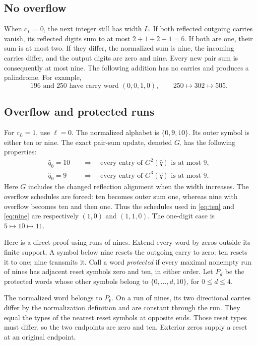 \documentclass[11pt]{article}
\begin{document}
\subsection{No overflow}
When $c_L=0$, the next integer still has width $L$. If both reflected outgoing
carries vanish, its reflected digits sum to at most $2+1+2+1=6$.
If both are one, their sum is at most two. If they differ, the normalized
sum is nine, the incoming carries differ, and the output digits are zero
and nine. Every new pair sum is consequently at most nine. The following
addition has no carries and produces a palindrome. For example,
\[
196\text{ and }250\text{ have carry word }(0,0,1,0),
\qquad 250\longmapsto302\longmapsto505.
\]

\subsection{Overflow and protected runs}
For $c_L=1$, use $\ell=0$. The normalized alphabet is $\{0,9,10\}$.
Its outer symbol is either ten or nine. The exact pair-sum update, denoted
$G$, has the following properties:
\begin{align}
 \widehat q_0=10&\quad\Longrightarrow\quad
         \text{every entry of }G^2(\widehat q)\text{ is at most }9,
         \label{eq:ten}\\
 \widehat q_0=9&\quad\Longrightarrow\quad
         \text{every entry of }G^3(\widehat q)\text{ is at most }9.
         \label{eq:nine}
\end{align}
Here $G$ includes the changed reflection alignment when the width increases.
The overflow schedules are forced: ten becomes outer sum one, whereas nine
with overflow becomes ten and then one. Thus the schedules used in
\eqref{eq:ten} and \eqref{eq:nine} are respectively $(1,0)$ and $(1,1,0)$.
The one-digit case is $5\mapsto10\mapsto11$.

Here is a direct proof using runs of nines. Extend every word by zeros
outside its finite support. A symbol below nine resets the outgoing carry
to zero; ten resets it to one; nine transmits it. Call a word \emph{protected}
if every maximal nonempty run of nines has adjacent reset symbols zero and
ten, in either order. Let $P_d$ be the protected words whose other symbols
belong to $\{0,\ldots,d,10\}$, for $0\leq d\leq4$.

The normalized word belongs to $P_0$. On a run of nines, its two directional
carries differ by the normalization definition and are constant through the
run. They equal the types of the nearest reset symbols at opposite ends.
Those reset types must differ, so the two endpoints are zero and ten.
Exterior zeros supply a reset at an original endpoint.
\end{document}
